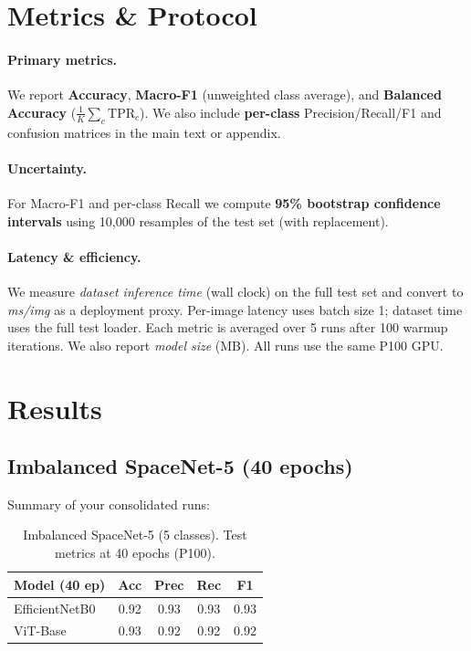 \section{Metrics \& Protocol}

\paragraph*{Primary metrics.}
We report \textbf{Accuracy}, \textbf{Macro-F1} (unweighted class average), and \textbf{Balanced Accuracy} ($\frac{1}{K}\sum_{c}\mathrm{TPR}_c$).
We also include \textbf{per-class} Precision/Recall/F1 and confusion matrices in the main text or appendix.

\paragraph*{Uncertainty.}
For Macro-F1 and per-class Recall we compute \textbf{95\% bootstrap confidence intervals} using 10{,}000 resamples of the test set (with replacement).

\paragraph*{Latency \& efficiency.}
We measure \emph{dataset inference time} (wall clock) on the full test set and convert to \emph{ms/img} as a deployment proxy. Per-image latency uses batch size 1; dataset time uses the full test loader. Each metric is averaged over 5 runs after 100 warmup iterations. We also report \emph{model size} (MB). All runs use the same P100 GPU.

\section{Results}
\subsection{Imbalanced SpaceNet-5 (40 epochs)}
Summary of your consolidated runs:

\begin{table}[!t]
\centering
\caption{Imbalanced SpaceNet-5 (5 classes). Test metrics at 40 epochs (P100).}
\begin{tabular}{lcccc}
\toprule
\textbf{Model (40 ep)} & Acc & Prec & Rec & F1 \\
\midrule
EfficientNetB0 & 0.92 & 0.93 & 0.93 & 0.93 \\
ViT-Base       & 0.93 & 0.92 & 0.92 & 0.92 \\
\bottomrule
\end{tabular}
\label{tab:imbal_main}
\end{table}

